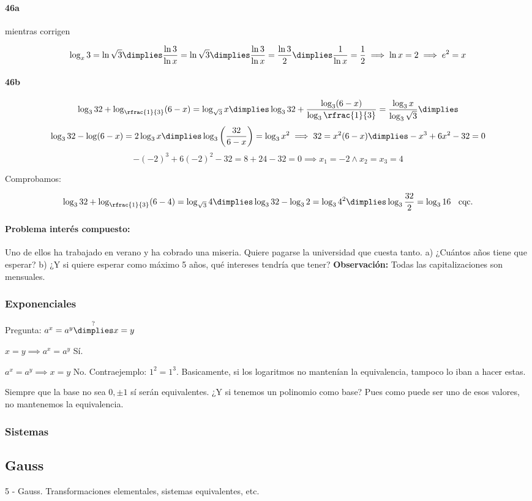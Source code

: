 \documentclass[palatino,nosec]{Docencia}
\begin{document}
\paragraph{46a} mientras corrigen

\[
	\log_x 3 = \ln \sqrt{3} \dimplies \frac{\ln3}{\ln x}=\ln\sqrt{3} \dimplies \frac{\ln3}{\ln x}=\frac{\ln3}{2} \dimplies \frac{1}{\ln x}=\frac{1}{2} \implies \ln x = 2 \implies e^2=x
\]

\paragraph{46b}
\[
	\log_332+\log_{\rfrac{1}{3}}(6-x) = \log_{\sqrt{3}}x \dimplies \log_332+\frac{\log_3(6-x)}{\log_3\rfrac{1}{3}} = \frac{\log_3x}{\log_3{\sqrt{3}}} \dimplies 
\]
\[
	\log_332-\log(6-x)=2\log_3x\dimplies \log_3\left(\frac{32}{6-x}\right)=\log_3x^2 \implies 32=x^2(6-x) \dimplies -x^3+6x^2-32 = 0
\]
\[
	-(-2)^3 + 6(-2)^2-32 = 8+24-32 = 0\implies x_1=-2 \wedge x_2=x_3=4
\]
 
Comprobamos:

\[
	\log_332+\log_{\rfrac{1}{3}}(6-4) = \log_{\sqrt{3}}4 \dimplies \log_332-\log_32=\log_34^2 \dimplies \log_3\frac{32}{2}=\log_316 \;\;\text{   cqc.}
\]


\paragraph{Problema interés compuesto:} Uno de ellos ha trabajado en verano y ha cobrado una miseria. Quiere pagarse la universidad que cuesta tanto.
a) ¿Cuántos años tiene que esperar?
b) ¿Y si quiere esperar como máximo 5 años, qué intereses tendría que tener?
\textbf{Observación:} Todas las capitalizaciones son mensuales.


\subsubsection{Exponenciales}

Pregunta: $a^x=a^y \overset{?}{\dimplies} x=y$

$x=y\implies a^x=a^y$ Sí.

$a^x=a^y\implies x=y$ No. Contraejemplo: $1^2=1^3$.  Basicamente, si los logaritmos no mantenían la equivalencia, tampoco lo iban a hacer estas.

Siempre que la base no sea $0,±1$ sí serán equivalentes. ¿Y si tenemos un polinomio como base? Pues como puede ser uno de esos valores, no mantenemos la equivalencia.



\subsubsection{Sistemas}



\subsection{Gauss}
5 - Gauss. Transformaciones elementales, sistemas equivalentes, etc.

\printindex
\end{document}
